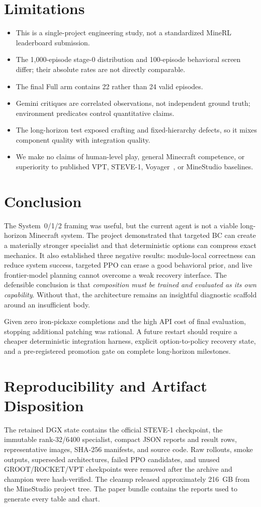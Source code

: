 \documentclass[10pt,twocolumn]{article}
\begin{document}
\section{Limitations}
\begin{itemize}
  \item This is a single-project engineering study, not a standardized MineRL leaderboard submission.
  \item The 1,000-episode stage-0 distribution and 100-episode behavioral screen differ; their absolute rates are not directly comparable.
  \item The final Full arm contains 22 rather than 24 valid episodes.
  \item Gemini critiques are correlated observations, not independent ground truth; environment predicates control quantitative claims.
  \item The long-horizon test exposed crafting and fixed-hierarchy defects, so it mixes component quality with integration quality.
  \item We make no claims of human-level play, general Minecraft competence, or superiority to published VPT, STEVE-1, Voyager~\cite{voyager}, or MineStudio baselines.
\end{itemize}

\section{Conclusion}
The System~0/1/2 framing was useful, but the current agent is not a viable long-horizon Minecraft system. The project demonstrated that targeted BC can create a materially stronger specialist and that deterministic options can compress exact mechanics. It also established three negative results: module-local correctness can reduce system success, targeted PPO can erase a good behavioral prior, and live frontier-model planning cannot overcome a weak recovery interface. The defensible conclusion is that \emph{composition must be trained and evaluated as its own capability}. Without that, the architecture remains an insightful diagnostic scaffold around an insufficient body.

Given zero iron-pickaxe completions and the high API cost of final evaluation, stopping additional patching was rational. A future restart should require a cheaper deterministic integration harness, explicit option-to-policy recovery state, and a pre-registered promotion gate on complete long-horizon milestones.

\section{Reproducibility and Artifact Disposition}
The retained DGX state contains the official STEVE-1 checkpoint, the immutable rank-32/6400 specialist, compact JSON reports and result rows, representative images, SHA-256 manifests, and source code. Raw rollouts, smoke outputs, superseded architectures, failed PPO candidates, and unused GROOT/ROCKET/VPT checkpoints were removed after the archive and champion were hash-verified. The cleanup released approximately 216~GB from the MineStudio project tree. The paper bundle contains the reports used to generate every table and chart.
\end{document}
